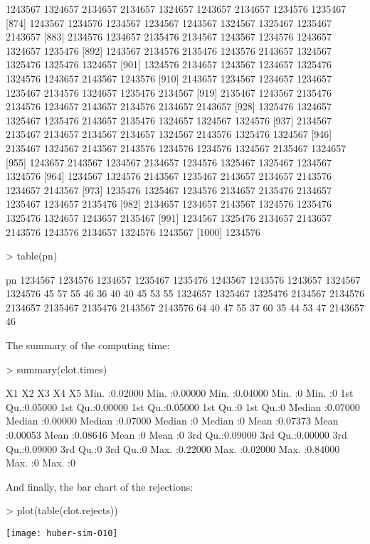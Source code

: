 \documentclass{scrartcl}
\begin{document}
\begin{Schunk}
\begin{Soutput}
 [865] 1243567 1324657 2134657 2134657 1324657 1243657 2134657 1234576 1235467
 [874] 1243567 1234576 1234567 1234567 1243567 1324567 1325467 1235467 2143657
 [883] 2134576 1234657 2135476 2134567 1243567 1234576 1243657 1324657 1235476
 [892] 1243567 2134576 2135476 1243576 2143657 1324567 1325476 1325476 1324657
 [901] 1324576 2134657 1243567 1234657 1325476 1324576 1243657 2143567 1243576
 [910] 2143657 1234567 1234657 1234657 1235467 2134576 1324657 1235476 2134567
 [919] 2135467 1243567 2135476 2134576 1234657 2143657 2134576 2134657 2143657
 [928] 1325476 1324657 1325467 1235476 2143657 2135476 1324657 1324567 1324576
 [937] 2134567 2135467 2134657 2134567 2134657 1324567 2143576 1325476 1324567
 [946] 2135467 1324567 2143567 2143576 1234576 1234576 1324567 2135467 1324657
 [955] 1243657 2143567 1234567 2134657 1234576 1325467 1325467 1234567 1324576
 [964] 1234567 1324576 2143567 1235467 2143657 2134657 2143576 1234657 2143567
 [973] 1235476 1325467 1234576 2134657 2135476 2134657 1235467 1234657 2135476
 [982] 2134657 1234657 2143567 1324576 1235476 1325476 1324657 1243657 2135467
 [991] 1234567 1325476 2134657 2143657 2143576 1243576 2134657 1324576 1243567
[1000] 1234576
\end{Soutput}
\begin{Sinput}
> table(pn)
\end{Sinput}
\begin{Soutput}
pn
1234567 1234576 1234657 1235467 1235476 1243567 1243576 1243657 1324567 1324576 
     45      57      55      46      36      40      40      45      53      55 
1324657 1325467 1325476 2134567 2134576 2134657 2135467 2135476 2143567 2143576 
     64      40      47      55      37      60      35      44      53      47 
2143657 
     46 
\end{Soutput}
\end{Schunk}

The summary of the computing time:

\begin{Schunk}
\begin{Sinput}
> summary(clot.times)
\end{Sinput}
\begin{Soutput}
       X1                X2                X3                X4          X5   
 Min.   :0.02000   Min.   :0.00000   Min.   :0.04000   Min.   :0   Min.   :0  
 1st Qu.:0.05000   1st Qu.:0.00000   1st Qu.:0.05000   1st Qu.:0   1st Qu.:0  
 Median :0.07000   Median :0.00000   Median :0.07000   Median :0   Median :0  
 Mean   :0.07373   Mean   :0.00053   Mean   :0.08646   Mean   :0   Mean   :0  
 3rd Qu.:0.09000   3rd Qu.:0.00000   3rd Qu.:0.09000   3rd Qu.:0   3rd Qu.:0  
 Max.   :0.22000   Max.   :0.02000   Max.   :0.84000   Max.   :0   Max.   :0  
\end{Soutput}
\end{Schunk}

And finally, the bar chart of the rejections:

\begin{Schunk}
\begin{Sinput}
> plot(table(clot.rejects))
\end{Sinput}
\end{Schunk}
\texttt{[image: huber-sim-010]}
\end{document}
